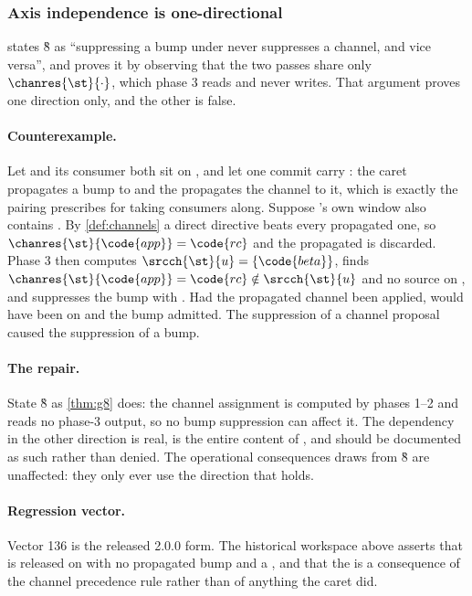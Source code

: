 \subsubsection{Axis independence is one-directional}

\begin{obligation}
\label{ob:g8}
 states \G{8} as ``suppressing a bump under  never
suppresses a channel, and vice versa'', and proves it by observing that the two
passes share only $\chanres{\st}{\cdot}$, which phase 3 reads and never writes. That
argument proves one direction only, and the other is false.
\end{obligation}

\paragraph{Counterexample.} Let  and its consumer  both
sit on \stable, and let one commit carry : the
caret propagates a bump to  and the  propagates the
 channel to it, which is exactly the pairing  prescribes
for taking consumers along. Suppose 's own window also contains
. By \cref{def:channels} a direct directive beats every
propagated one, so $\chanres{\st}{\code{app}} = \code{rc}$ and the propagated
 is discarded. Phase 3 then computes
$\srcch{\st}{u} = \{\code{beta}\}$, finds
$\chanres{\st}{\code{app}} = \code{rc} \notin \srcch{\st}{u}$ and no source on
\stable, and suppresses the bump with . Had the propagated channel
been applied,  would have been on  and the bump admitted.
The suppression of a channel proposal caused the suppression of a bump.

\paragraph{The repair.} State \G{8} as \cref{thm:g8} does: the channel
assignment is computed by phases 1--2 and reads no phase-3 output, so no bump
suppression can affect it. The dependency in the other direction is real, is
the entire content of , and should be documented as such rather than
denied. The operational consequences  draws from \G{8} are
unaffected: they only ever use the direction that holds.

\paragraph{Regression vector.} Vector 136 is the released 2.0.0 form. The historical workspace above asserts that  is
released on  with no propagated bump and a , and that the
 is a consequence of the channel precedence rule rather than of
anything the caret did.

